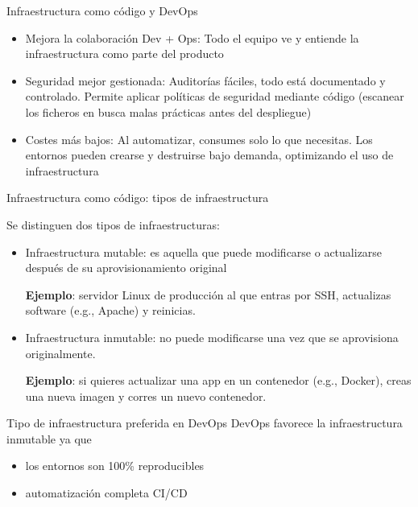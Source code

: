 \documentclass{beamer}
\begin{document}
\begin{frame}{Infraestructura como código y DevOps}

\begin{itemize}
     \item Mejora la colaboración Dev + Ops: Todo el equipo ve y entiende la infraestructura como parte del producto
    \item Seguridad mejor gestionada: Auditorías fáciles, todo está documentado y controlado. Permite aplicar políticas de seguridad mediante código (escanear los ficheros en busca malas prácticas antes del despliegue)
    \item Costes más bajos: Al automatizar, consumes solo lo que necesitas. Los entornos pueden crearse y destruirse bajo demanda, optimizando el uso de infraestructura
    
\end{itemize}
    
\end{frame}

\begin{frame}{Infraestructura como código: tipos de infraestructura}

Se distinguen dos tipos de infraestructuras:
\begin{itemize}
    \item Infraestructura mutable: es aquella que puede modificarse o actualizarse después de su aprovisionamiento original

    \textbf{Ejemplo}: servidor Linux de producción al que entras por SSH, actualizas software (e.g., Apache) y reinicias.

    \pause
    
    \item Infraestructura inmutable: no puede modificarse una vez que se aprovisiona originalmente.
    
    \textbf{Ejemplo}: si quieres actualizar una app en un contenedor (e.g., Docker), creas una nueva imagen y corres un nuevo contenedor.
\end{itemize}

\pause

\begin{block}{Tipo de infraestructura preferida en DevOps}
DevOps favorece la infraestructura inmutable ya que 

\begin{itemize}
    \item los entornos son 100\% reproducibles
    \item automatización completa CI/CD
\end{itemize}
\end{block}
    
\end{frame}
\end{document}

